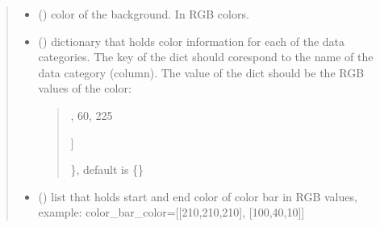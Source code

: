 \documentclass[letterpaper,10pt,english]{sphinxmanual}
\begin{document}
\begin{fulllineitems}
\begin{quote}
\begin{description}
\begin{itemize}
\item {} 
\sphinxAtStartPar
{} (\sphinxstyleliteralemphasis{\sphinxupquote{ (}}\sphinxstyleliteralemphasis{\sphinxupquote{, }}\sphinxstyleliteralemphasis{\sphinxupquote{, }}\sphinxstyleliteralemphasis{\sphinxupquote{)}}) \textendash{} color of the background. In RGB colors.

\item {} 
\sphinxAtStartPar
{} () \textendash{} 
\sphinxAtStartPar
dictionary that holds color information for each of the data categories. The key of the dict should
corespond to the name of the data category (column). The value of the dict should be the RGB values of the color:
\begin{quote}
\begin{description}
\sphinxlineitem{\{}\begin{description}
\sphinxlineitem{“United States”: {[}}
,
60,
225

\end{description}

\sphinxAtStartPar
{]}

\end{description}

\sphinxAtStartPar
\}, default is \{\}
\end{quote}


\item {} 
\sphinxAtStartPar
{} (\sphinxstyleliteralemphasis{\sphinxupquote{{[}}}\sphinxstyleliteralemphasis{\sphinxupquote{{]}}}) \textendash{} list that holds start and end color of color bar in RGB values, example: color\_bar\_color={[}{[}210,210,210{]}, {[}100,40,10{]}{]}

\end{itemize}

\end{description}\end{quote}

\end{fulllineitems}

\label{\detokenize{index:module-sjvisualizer.DynamicMatrix}}
\end{document}
